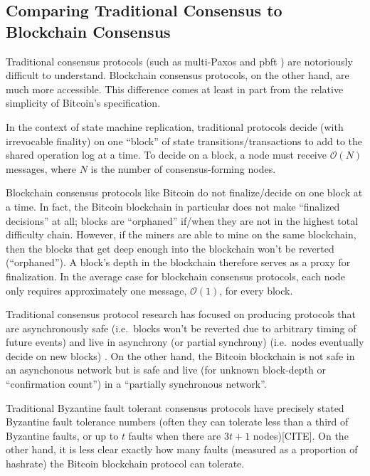 \documentclass{article}
\theoremstyle{definition}
\begin{document}
\subsection{Comparing Traditional Consensus to Blockchain Consensus}

Traditional consensus protocols (such as multi-Paxos \cite{paxos} and pbft \cite{Castro_Liskov_1999_pbft}) are notoriously difficult to understand.\cite{paxos} Blockchain consensus protocols, on the other hand, are much more accessible. This difference comes at least in part from the relative simplicity of Bitcoin's specification.

In the context of state machine replication, traditional protocols decide (with irrevocable finality) on one ``block'' of state transitions/transactions to add to the shared operation log at a time.\cite{paxos} To decide on a block, a node must receive $\mathcal{O}(N)$ messages, where $N$ is the number of consensus-forming nodes.\cite{Castro_Liskov_1999_pbft}

Blockchain consensus protocols like Bitcoin do not finalize/decide on one block at a time.\cite{nakamoto} In fact, the Bitcoin blockchain in particular does not make ``finalized decisions'' at all; blocks are ``orphaned'' if/when they are not in the highest total difficulty chain. \cite{orphanBitcoin} However, if the miners are able to mine on the same blockchain, then the blocks that get deep enough into the blockchain won't be reverted (``orphaned''). A block's depth in the blockchain therefore serves as a proxy for finalization. In the average case for blockchain consensus protocols, each node only requires approximately one message, $\mathcal{O}(1)$, for every block.

Traditional consensus protocol research has focused on producing protocols that are asynchronously safe (i.e.\ blocks won't be reverted due to arbitrary timing of future events) and live in asynchrony (or partial synchrony) (i.e.\ nodes eventually decide on new blocks) \cite{Fischer_Lynch_Paterson_FLP_Impossibility_1985}. On the other hand, the Bitcoin blockchain is not safe in an asynchonous network but is safe and live (for unknown block-depth or ``confirmation count'') in a ``partially synchronous network''.

Traditional Byzantine fault tolerant consensus protocols have precisely stated Byzantine fault tolerance numbers (often they can tolerate less than a third of Byzantine faults, or up to $t$ faults when there are $3t + 1$ nodes)[CITE]. On the other hand, it is less clear exactly how many faults (measured as a proportion of hashrate) the Bitcoin blockchain protocol can tolerate.
\end{document}
